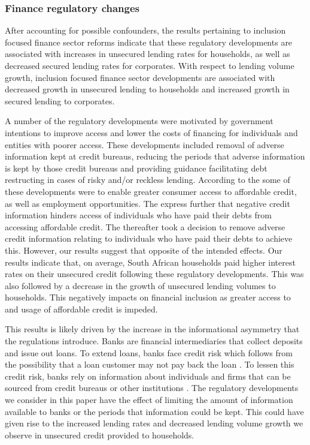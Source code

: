 \documentclass[
  letterpaper,
  DIV=11,
  numbers=noendperiod]{scrartcl}
\begin{document}
\subsubsection{Finance regulatory
changes}\label{finance-regulatory-changes}

After accounting for possible confounders, the results pertaining to
inclusion focused finance sector reforms indicate that these regulatory
developments are associated with increases in unsecured lending rates
for households, as well as decreased secured lending rates for
corporates. With respect to lending volume growth, inclusion focused
finance sector developments are associated with decreased growth in
unsecured lending to households and increased growth in secured lending
to corporates.

A number of the regulatory developments were motivated by government
intentions to improve access and lower the costs of financing for
individuals and entities with poorer access. These developments included
removal of adverse information kept at credit bureaus, reducing the
periods that adverse information is kept by those credit bureaus and
providing guidance facilitating debt restructing in cases of risky
and/or reckless lending. According to the \citet{ncrnd} some of these
developments were to enable greater consumer access to affordable
credit, as well as employment opportunities. The \citet{sagov2013}
express further that negative credit information hinders access of
individuals who have paid their debts from accessing affordable credit.
The \citet{sagov2013} thereafter took a decision to remove adverse
credit information relating to individuals who have paid their debts to
achieve this. However, our results suggest that opposite of the intended
effects. Our results indicate that, on average, South African households
paid higher interest rates on their unsecured credit following these
regulatory developments. This was also followed by a decrease in the
growth of unsecured lending volumes to households. This negatively
impacts on financial inclusion as greater access to and usage of
affordable credit is impeded.

This results is likely driven by the increase in the informational
asymmetry that the regulations introduce. Banks are financial
intermediaries that collect deposits and issue out loans. To extend
loans, banks face credit risk which follows from the possibility that a
loan customer may not pay back the loan
\citep[\citet{freixas1997}]{bikker142017}. To lessen this credit risk,
banks rely on information about individuals and firms that can be
sourced from credit bureaus or other institutions \citep{freixas1997}.
The regulatory developments we consider in this paper have the effect of
limiting the amount of information available to banks or the periods
that information could be kept. This could have given rise to the
increased lending rates and decreased lending volume growth we observe
in unsecured credit provided to households.
\end{document}
